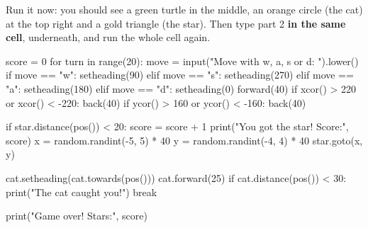 Run it now: you should see a green turtle in the middle, an orange circle (the cat) at the top right and a gold triangle (the star). Then type part 2 \textbf{in the same cell}, underneath, and run the whole cell again.

\lstset{firstnumber=25}
\begin{typethis}
score = 0
for turn in range(20):
    move = input("Move with w, a, s or d: ").lower()
    if move == "w":
        setheading(90)
    elif move == "s":
        setheading(270)
    elif move == "a":
        setheading(180)
    elif move == "d":
        setheading(0)
    forward(40)
    if xcor() > 220 or xcor() < -220:
        back(40)
    if ycor() > 160 or ycor() < -160:
        back(40)

    if star.distance(pos()) < 20:
        score = score + 1
        print("You got the star! Score:", score)
        x = random.randint(-5, 5) * 40
        y = random.randint(-4, 4) * 40
        star.goto(x, y)

    cat.setheading(cat.towards(pos()))
    cat.forward(25)
    if cat.distance(pos()) < 30:
        print("The cat caught you!")
        break

print("Game over! Stars:", score)
\end{typethis}
\lstset{firstnumber=1}


